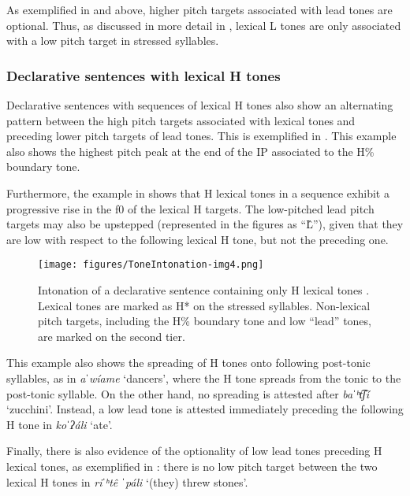 As exemplified in  and  above, higher pitch targets associated with lead tones are optional. Thus, as discussed in more detail in \citet{kubuzono2020raramuri}, lexical L tones are only associated with a low pitch target in stressed syllables.

\subsubsection{Declarative sentences with lexical H tones}
\label{subsubsec: intonation declaratives H}

Declarative sentences with sequences of lexical H tones also show an alternating pattern between the high pitch targets associated with lexical tones and preceding lower pitch targets of lead tones. This is exemplified in . This example also shows the highest pitch peak at the end of the IP associated to the H\% boundary tone.

Furthermore, the example in  shows that H lexical tones in a sequence exhibit a progressive rise in the f0 of the lexical H targets. The low-pitched lead pitch targets may also be upstepped (represented in the figures as “\^  L”), given that they are low with respect to the following lexical H tone, but not the preceding one.

\begin{figure}
\texttt{[image: figures/ToneIntonation-img4.png]}
\caption{
\label{fig: declaratives with lexical H tones}
Intonation of a declarative sentence containing only H lexical tones \parencite{kubuzono2020raramuri}. Lexical tones are marked as H* on the stressed syllables. Non-lexical pitch targets, including the H\% boundary tone and low “lead” tones, are marked on the second tier.}
\end{figure}

This example also shows the spreading of H tones onto following post-tonic syllables, as in \textit{aˈwíame} ‘dancers', where the H tone spreads from the tonic to the post-tonic syllable. On the other hand, no spreading is attested after \textit{baˈʰt͡ʃí} `zucchini'. Instead, a low lead tone is attested immediately preceding the following H tone in \textit{koˈʔáli} `ate'.

Finally, there is also evidence of the optionality of low lead tones preceding H lexical tones, as exemplified in : there is no low pitch target between the two lexical H tones in \textit{riˈʰtê ˈpáli} `(they) threw stones'.

